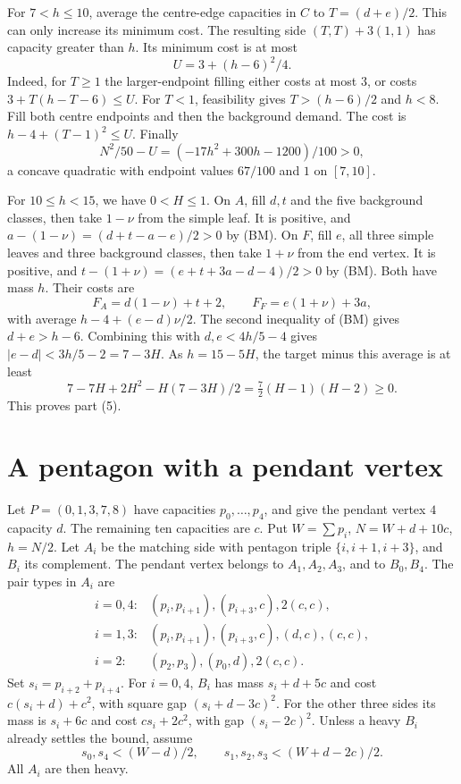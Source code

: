 \documentclass[11pt]{article}
\begin{document}
For $7<h\leq10$, average the centre-edge capacities in $C$ to
$T=(d+e)/2$. This can only increase its minimum cost.
The resulting side $(T,T)+3(1,1)$ has capacity greater than $h$.
Its minimum cost is at most
\[
 U=3+(h-6)^2/4 .
\]
Indeed, for $T\geq1$ the larger-endpoint filling either costs at most $3$,
or costs $3+T(h-T-6)\leq U$.
For $T<1$, feasibility gives $T>(h-6)/2$ and $h<8$.
Fill both centre endpoints and then the background demand.
The cost is $h-4+(T-1)^2\leq U$.
Finally
\[
 N^2/50-U=(-17h^2+300h-1200)/100>0,
\]
a concave quadratic with endpoint values $67/100$ and $1$ on $[7,10]$.

For $10\leq h<15$, we have $0<H\leq1$.
On $A$, fill $d,t$ and the five background classes, then take
$1-\nu$ from the simple leaf. It is positive, and
$a-(1-\nu)=(d+t-a-e)/2>0$ by (BM).
On $F$, fill $e$, all three simple leaves and three background classes,
then take $1+\nu$ from the end vertex. It is positive, and
$t-(1+\nu)=(e+t+3a-d-4)/2>0$ by (BM).
Both have mass $h$. Their costs are
\[
 F_A=d(1-\nu)+t+2,\qquad F_F=e(1+\nu)+3a,
\]
with average $h-4+(e-d)\nu/2$.
The second inequality of (BM) gives $d+e>h-6$.
Combining this with $d,e<4h/5-4$ gives
$|e-d|<3h/5-2=7-3H$.
As $h=15-5H$, the target minus this average is at least
\[
 7-7H+2H^2-H(7-3H)/2
 =\tfrac72(H-1)(H-2)\geq0 .
\]
This proves part (5).

\section{A pentagon with a pendant vertex}
Let $P=(0,1,3,7,8)$ have capacities $p_0,\ldots,p_4$,
and give the pendant vertex $4$ capacity $d$.
The remaining ten capacities are $c$.
Put $W=\sum p_i$, $N=W+d+10c$, $h=N/2$.
Let $A_i$ be the matching side with pentagon triple
$\{i,i+1,i+3\}$, and $B_i$ its complement.
The pendant vertex belongs to $A_1,A_2,A_3$, and to $B_0,B_4$.
The pair types in $A_i$ are
\[
\begin{array}{ll}
 i=0,4:&(p_i,p_{i+1}),(p_{i+3},c),2(c,c),\\
 i=1,3:&(p_i,p_{i+1}),(p_{i+3},c),(d,c),(c,c),\\
 i=2:&(p_2,p_3),(p_0,d),2(c,c).
\end{array}
\]
Set $s_i=p_{i+2}+p_{i+4}$.
For $i=0,4$, $B_i$ has mass $s_i+d+5c$ and cost
$c(s_i+d)+c^2$, with square gap $(s_i+d-3c)^2$.
For the other three sides its mass is $s_i+6c$ and cost
$cs_i+2c^2$, with gap $(s_i-2c)^2$.
Unless a heavy $B_i$ already settles the bound, assume
\[
 s_0,s_4<(W-d)/2,\qquad
 s_1,s_2,s_3<(W+d-2c)/2. \tag{PB}
\]
All $A_i$ are then heavy.
\end{document}
